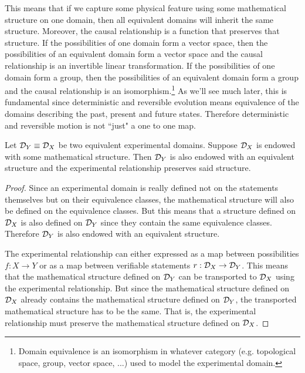 \documentclass[11pt,letterpaper,fleqn]{memoir} %
\begin{document}
This means that if we capture some physical feature using some mathematical structure on one domain, then all equivalent domains will inherit the same structure. Moreover, the causal relationship is a function that preserves that structure. If the possibilities of one domain form a vector space, then the possibilities of an equivalent domain form a vector space and the causal relationship is an invertible linear transformation. If the possibilities of one domain form a group, then the possibilities of an equivalent domain form a group and the causal relationship is an isomorphism.\footnote{Domain equivalence is an isomorphism in whatever category (e.g. topological space, group, vector space, ...) used to model the experimental domain.} As we'll see much later, this is fundamental since deterministic and reversible evolution means equivalence of the domains describing the past, present and future states. Therefore deterministic and reversible motion is not ``just" a one to one map.

\begin{mathSection}
	\begin{thrm}\label{thrm_domain_equivalence_is_isomorphism}
		Let $\mathcal{D}_Y \equiv \mathcal{D}_X$ be two equivalent experimental domains. Suppose $\mathcal{D}_X$ is endowed with some mathematical structure. Then $\mathcal{D}_Y$ is also endowed with an equivalent structure and the experimental relationship preserves said structure.
	\end{thrm}
\begin{proof}
	Since an experimental domain is really defined not on the statements themselves but on their equivalence classes, the mathematical structure will also be defined on the equivalence classes. But this means that a structure defined on $\mathcal{D}_X$ is also defined on $\mathcal{D}_Y$ since they contain the same equivalence classes. Therefore $\mathcal{D}_Y$ is also endowed with an equivalent structure.
	
	The experimental relationship can either expressed as a map between possibilities $f : X \to Y$ or as a map between verifiable statements $r : \mathcal{D}_X \to \mathcal{D}_Y$. This means that the mathematical structure defined on $\mathcal{D}_Y$ can be transported to $\mathcal{D}_X$ using the experimental relationship. But since the mathematical structure defined on $\mathcal{D}_X$ already contains the mathematical structure defined on $\mathcal{D}_Y$, the transported mathematical structure has to be the same. That is, the experimental relationship must preserve the mathematical structure defined on $\mathcal{D}_X$.
\end{proof}
\end{mathSection}
\end{document}
